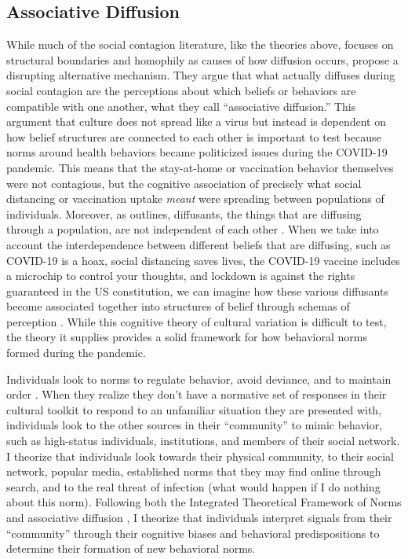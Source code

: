 \hypertarget{associative-diffusion}{%
\subsection{Associative Diffusion}\label{associative-diffusion}}

While much of the social contagion literature, like the theories above, focuses
on structural boundaries and homophily as causes of how diffusion occurs,
\citet{goldbergSocialContagionAssociative2018} propose a disrupting alternative
mechanism. They argue that what actually diffuses during social contagion are
the perceptions about which beliefs or behaviors are compatible with one
another, what they call ``associative diffusion.'' This argument that culture
does not spread like a virus but instead is dependent on how belief structures
are connected to each other is important to test because norms around health
behaviors became politicized issues during the COVID-19 pandemic. This means
that the stay-at-home or vaccination behavior themselves were not contagious,
but the cognitive association of precisely what social distancing or vaccination
uptake \emph{meant} were spreading between populations of individuals. Moreover,
as \citet{houghton20} outlines, diffusants, the things that are diffusing
through a population, are not independent of each other \citep{mason_etal07}.
When we take into account the interdependence between different beliefs that are
diffusing, such as COVID-19 is a hoax, social distancing saves lives, the
COVID-19 vaccine includes a microchip to control your thoughts, and lockdown is
against the rights guaranteed in the US constitution, we can imagine how these
various diffusants become associated together into structures of belief through
schemas of perception \citep{houghton20}. While this cognitive theory of
cultural variation is difficult to test, the theory it supplies provides a solid
framework for how behavioral norms formed during the pandemic.

Individuals look to norms to regulate behavior, avoid deviance, and to maintain
order \citep{horneNormsIntegratedFramework2020,
shepherdStructurePerceptionHow2017}. When they realize they don't have a
normative set of responses in their cultural toolkit to respond to an unfamiliar
situation they are presented with, individuals look to the other sources in
their ``community'' to mimic behavior, such as high-status individuals,
institutions, and members of their social network. I theorize that individuals
look towards their physical community, to their social network, popular media,
established norms that they may find online through search, and to the real
threat of infection (what would happen if I do nothing about this norm).
Following both the Integrated Theoretical Framework of Norms
\citep{horneNormsIntegratedFramework2020} and associative diffusion
\citep{dellapostaWhyLiberalsDrink2015, goldbergSocialContagionAssociative2018},
I theorize that individuals interpret signals from their ``community'' through
their cognitive biases and behavioral predispositions to determine their
formation of new behavioral norms.

